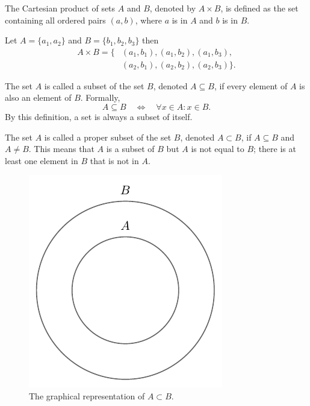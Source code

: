 \begin{definition}
	\label{def:cartesian_product}
	The Cartesian product of sets $A$ and $B$, denoted by $A \times B$, is defined as the set containing all ordered pairs $(a, b)$, where $a$ is in $A$ and $b$ is in $B$.
\end{definition}

\begin{example}
	Let $A = \{a_1, a_2\}$ and $B = \{b_1, b_2, b_3\}$ then
	\begin{equation}
		\begin{split}
			A\times B = \{&(a_1,b_1),(a_1,b_2),(a_1,b_3),\\
			&(a_2,b_1),(a_2,b_2),(a_2,b_3)\}.
		\end{split}
	\end{equation}
\end{example}

\begin{definition}[Subset]
	\label{def:subset}
	The set $A$ is called a subset of the set $B$, denoted $A \subseteq B$, if every element of $A$ is also an element of $B$. Formally, 
	\begin{equation}
		A\subseteq B \quad \Longleftrightarrow \quad\forall x \in A \colon x\in B.
	\end{equation}
	By this definition, a set is always a subset of itself.
\end{definition}

\begin{definition}
	\label{def:proper_subset}
	The set $A$ is called a proper subset of the set $B$, denoted $A \subset B$, if $A \subseteq B$ and $A \neq B$. This means that $A$ is a subset of $B$ but $A$ is not equal to $B$; there is at least one element in $B$ that is not in $A$.
	\begin{figure}[H]
		\centering
		\includegraphics[]{figures/set_subset.pdf}
		\caption{The graphical representation of $A\subset B$.}
		\label{fig:set_subset}
	\end{figure}
\end{definition}

